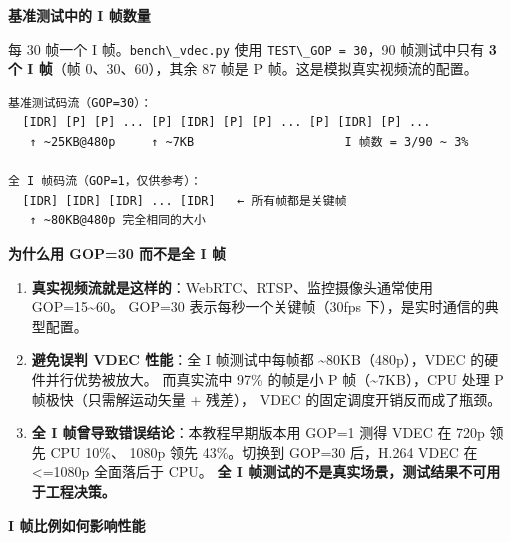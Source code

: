 \textbf{基准测试中的 I 帧数量}

每 30 帧一个 I 帧。\passthrough{\lstinline!bench\_vdec.py!} 使用
\passthrough{\lstinline!TEST\_GOP = 30!}，90 帧测试中只有 \textbf{3 个 I
帧}（帧 0、30、60），其余 87 帧是 P 帧。这是模拟真实视频流的配置。

\begin{lstlisting}
基准测试码流（GOP=30）：
  [IDR] [P] [P] ... [P] [IDR] [P] [P] ... [P] [IDR] [P] ...
   ↑ ~25KB@480p     ↑ ~7KB                     I 帧数 = 3/90 ~ 3%

全 I 帧码流（GOP=1，仅供参考）：
  [IDR] [IDR] [IDR] ... [IDR]   ← 所有帧都是关键帧
   ↑ ~80KB@480p 完全相同的大小
\end{lstlisting}

\textbf{为什么用 GOP=30 而不是全 I 帧}

\begin{enumerate}
\def\labelenumi{\arabic{enumi}.}
\item
  \textbf{真实视频流就是这样的}：WebRTC、RTSP、监控摄像头通常使用
  GOP=15\textasciitilde60。 GOP=30 表示每秒一个关键帧（30fps
  下），是实时通信的典型配置。
\item
  \textbf{避免误判 VDEC 性能}：全 I 帧测试中每帧都
  \textasciitilde80KB（480p），VDEC 的硬件并行优势被放大。 而真实流中
  97\% 的帧是小 P 帧（\textasciitilde7KB），CPU 处理 P
  帧极快（只需解运动矢量 + 残差）， VDEC 的固定调度开销反而成了瓶颈。
\item
  \textbf{全 I 帧曾导致错误结论}：本教程早期版本用 GOP=1 测得 VDEC 在
  720p 领先 CPU 10\%、 1080p 领先 43\%。切换到 GOP=30 后，H.264 VDEC 在
  \textless=1080p 全面落后于 CPU。 \textbf{全 I
  帧测试的不是真实场景，测试结果不可用于工程决策。}
\end{enumerate}

\textbf{I 帧比例如何影响性能}

